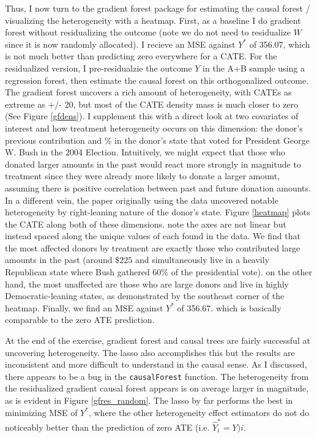\documentclass{article}
\begin{document}
  Thus, I now turn to the gradient forest package for estimating the causal forest / visualizing the heterogeneity with a heatmap. First, as a baseline I do gradient forest without residualizing the outcome (note we do not need to residualize $W$ since it is now randomly allocated). I recieve an MSE against $Y^*$ of 356.07, which is not much better than predicting zero everywhere for a CATE. For the residualized version, I pre-residualzie the outcome $Y$ in the A+B sample using a regression forest, then estimate the causal forest on this orthogonalized outcome. The gradient forest  uncovers a rich amount of heterogeneity, with CATEs as extreme as +/- 20, but most of the CATE density mass is much closer to zero (See Figure \ref{gfdens}). I supplement this with a direct look at two covariates of interest and how treatment heterogeneity occurs on this dimension: the donor's previous contribution and \% in the donor's state that voted for President George W. Bush in the 2004 Election. Intuitively, we might expect that those who donated larger amounts in the past would react more strongly in magnitude to treatment since they were already more likely to donate a larger amount, assuming there is positive correlation between past and future donation amounts. In a different vein, the paper originally using the data uncovered notable heterogeneity by right-leaning nature of the donor's state. Figure \ref{heatmap} plots the CATE along both of these dimensions. note the axes are not linear but instead spaced along the unique values of each found in the data. We find that the most affected donors by treatment are exactly those who contributed large amounts in the past (around $\$225$ and simultaneously live in a heavily Republican state where Bush gathered 60\% of the presidential vote). on the other hand, the most unaffected are those who are large donors and live in highly Democratic-leaning states, as demonstrated by the southeast corner of the heatmap. Finally, we find an MSE against $Y^*$ of 356.67. which is basically comparable to the zero ATE prediction.

At the end of the exercise, gradient forest and causal trees are fairly successful at uncovering heterogeneity. The lasso also accomplishes this but the results are inconsistent and more difficult to understand in the causal sense. As I discussed, there appears to be a bug in the \texttt{causalForest} function. The heterogeneity from the residualized gradient causal forest appears is on average larger in magnitude, as is evident in Figure \ref{gfres_random}. The lasso by far performs the best in minimizing MSE of $Y^*$, where the other heterogeneity effect estimators do not do noticeably better than the prediction of zero ATE (i.e. $\hat Y_i^* = Y)i$.
\end{document}
